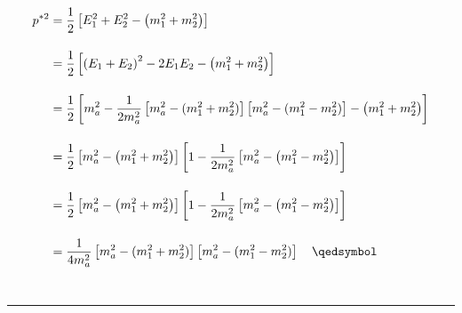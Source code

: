 \begin{solution}
{\allowdisplaybreaks
\begin{align*}
     p^{\ast2} &= \frac{1}{2} \left[ E_1^2 + E_2^2 - \left(m_1^2 +m_2^2\right) \right] \\[0.15in]
                                                                  &= \frac{1}{2} \left[ \left(E_1+E_2\right)^2 - 2E_1E_2 - \left(m_1^2 +m_2^2\right) \right] \\[0.15in]
                                                                  &= \frac{1}{2} \left[ m_a^2 -\frac{1}{2m_a^2}\left[m_a^2 - (m_1^2 + m_2^2)\right]\left[m_a^2 - (m_1^2 - m_2^2)\right] - \left(m_1^2 +m_2^2\right) \right] \\[0.15in]
                                                                  &= \frac{1}{2} \left[ m_a^2 - \left( m_1^2 +m_2^2\right)\right]\left[1-\frac{1}{2m_a^2} \left[ m_a^2 - \left( m_1^2 -m_2^2\right)\right] \right] \\[0.15in]
                                                                  &= \frac{1}{2} \left[ m_a^2 - \left( m_1^2 +m_2^2\right)\right]\left[1-\frac{1}{2m_a^2} \left[ m_a^2 - \left( m_1^2 -m_2^2\right)\right] \right] \\[0.15in]
                                                                  &= \frac{1}{4m_a^2} \left[m_a^2 - (m_1^2 + m_2^2)\right]\left[m_a^2 - (m_1^2 - m_2^2)\right] \qed
\end{align*}\\
}
\end{solution} 
\noindent\rule{7in}{1.5pt}


